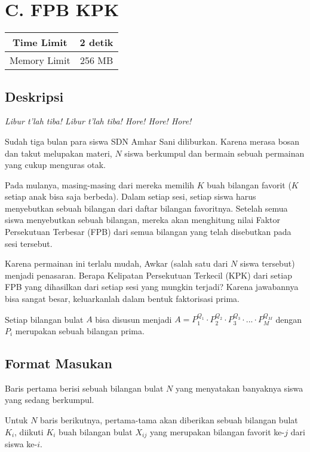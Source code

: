 \documentclass{article}
\begin{document}
\section*{\hfil C. FPB KPK\hfil}

\begin{center}
\begin{tabular}{ |cc| } 
 \hline
 Time Limit & 2 detik \\ 
 \hline
 Memory Limit & 256 MB \\
 \hline
\end{tabular}
\end{center}

\subsection*{Deskripsi}

\par\noindent 
\textit{Libur t'lah tiba! Libur t'lah tiba! Hore! Hore! Hore!}
\newline
\par\noindent Sudah tiga bulan para siswa SDN Amhar Sani diliburkan. Karena merasa bosan dan takut melupakan materi, $N$ siswa berkumpul dan bermain sebuah permainan yang cukup menguras otak.
\newline
\par\noindent 
Pada mulanya, masing-masing dari mereka memilih $K$ buah bilangan favorit ($K$ setiap anak bisa saja berbeda). Dalam setiap sesi, setiap siswa harus menyebutkan sebuah bilangan dari daftar bilangan favoritnya. Setelah semua siswa menyebutkan sebuah bilangan, mereka akan menghitung nilai Faktor Persekutuan Terbesar (FPB) dari semua bilangan yang telah disebutkan pada sesi tersebut.
\newline
\par\noindent 
Karena permainan ini terlalu mudah, Awkar (salah satu dari $N$ siswa tersebut) menjadi penasaran. Berapa Kelipatan Persekutuan Terkecil (KPK) dari setiap FPB yang dihasilkan dari setiap sesi yang mungkin terjadi? Karena jawabannya bisa sangat besar, keluarkanlah dalam bentuk faktorisasi prima.
\newline
\par\noindent 
Setiap bilangan bulat $A$ bisa disusun menjadi $A = P_{1}^{Q_{1}} \cdot P_{2}^{Q_{2}} \cdot P_{3}^{Q_{3}} \cdot ... \cdot P_{M}^{Q_{M}}$ dengan $P_{i}$ merupakan sebuah bilangan prima.

\subsection*{Format Masukan}
\par\noindent 
Baris pertama berisi sebuah bilangan bulat $N$ yang menyatakan banyaknya siswa yang sedang berkumpul.
\newline
\par\noindent 
Untuk $N$ baris berikutnya, pertama-tama akan diberikan sebuah bilangan bulat $K_i$, diikuti $K_i$ buah bilangan bulat $X_{ij}$ yang merupakan bilangan favorit ke-$j$ dari siswa ke-$i$.
\end{document}
